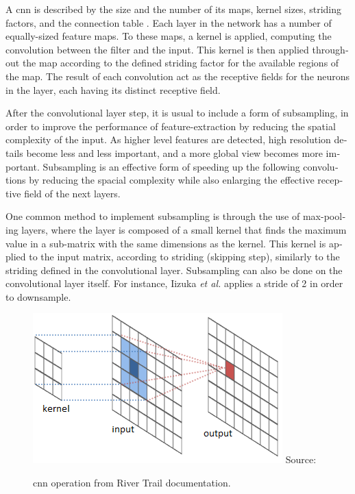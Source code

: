 \documentclass[12pt,openright,oneside,a4paper,english, brazilian]{abntex2}
\begin{document}
\begin{otherlanguage}{english}
A \acrshort{cnn} is described by the size and the number of its maps, kernel sizes, striding factors, and the connection table \cite{Ciresan2011}. Each layer in the network has a number of equally-sized feature maps. To these maps, a kernel is applied, computing the convolution between the filter and the input. This kernel is then applied throughout the map according to the defined striding factor for the available regions of the map. The result of each convolution act as the receptive fields for the neurons in the layer, each having its distinct receptive field.

After the convolutional layer step, it is usual to include a form of subsampling, in order to improve the performance of feature-extraction by reducing the spatial complexity of the input. As higher level features are detected, high resolution details become less and less important, and a more global view becomes more important. Subsampling is an effective form of speeding up the following convolutions by reducing the spacial complexity while also enlarging the effective receptive field of the next layers.

One common method to implement subsampling is through the use of max-pooling layers,
where the layer is composed of a small kernel that finds the maximum value in a sub-matrix with the same dimensions as the kernel. This kernel is applied to the input matrix, according to striding (skipping step), similarly to the striding defined in the convolutional layer. Subsampling can also be done on the convolutional layer itself. For instance, Iizuka \textit{et al.} \cite{Iizuka2016} applies a stride of 2 in order to downsample.

\begin{figure}[!htb]
\centering
\caption{\acrshort{cnn} operation from River Trail documentation.}
\includegraphics[width=\textwidth]{CNN}
Source: \cite{river_trail}
\label{cnn_fig}
\end{figure}


\end{otherlanguage}
\end{document}
